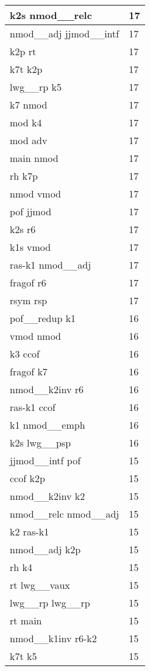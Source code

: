 \documentclass[a4 paper]{article}
\begin{document}
\begin{longtable}{p{}p{}}
k2s nmod\_\_relc  & 17 \\ \midrule
nmod\_\_adj jjmod\_\_intf  & 17 \\ \midrule
k2p rt  & 17 \\ \midrule
k7t k2p  & 17 \\ \midrule
lwg\_\_rp k5  & 17 \\ \midrule
k7 nmod  & 17 \\ \midrule
mod k4  & 17 \\ \midrule
mod adv  & 17 \\ \midrule
main nmod  & 17 \\ \midrule
rh k7p  & 17 \\ \midrule
nmod vmod  & 17 \\ \midrule
pof jjmod  & 17 \\ \midrule
k2s r6  & 17 \\ \midrule
k1s vmod  & 17 \\ \midrule
ras-k1 nmod\_\_adj  & 17 \\ \midrule
fragof r6  & 17 \\ \midrule
rsym rsp  & 17 \\ \midrule
pof\_\_redup k1  & 16 \\ \midrule
vmod nmod  & 16 \\ \midrule
k3 ccof  & 16 \\ \midrule
fragof k7  & 16 \\ \midrule
nmod\_\_k2inv r6  & 16 \\ \midrule
ras-k1 ccof  & 16 \\ \midrule
k1 nmod\_\_emph  & 16 \\ \midrule
k2s lwg\_\_psp  & 16 \\ \midrule
jjmod\_\_intf pof  & 15 \\ \midrule
ccof k2p  & 15 \\ \midrule
nmod\_\_k2inv k2  & 15 \\ \midrule
nmod\_\_relc nmod\_\_adj  & 15 \\ \midrule
k2 ras-k1  & 15 \\ \midrule
nmod\_\_adj k2p  & 15 \\ \midrule
rh k4  & 15 \\ \midrule
rt lwg\_\_vaux  & 15 \\ \midrule
lwg\_\_rp lwg\_\_rp  & 15 \\ \midrule
rt main  & 15 \\ \midrule
nmod\_\_k1inv r6-k2  & 15 \\ \midrule
k7t k5  & 15 \\ \midrule

\end{longtable}
\end{document}
